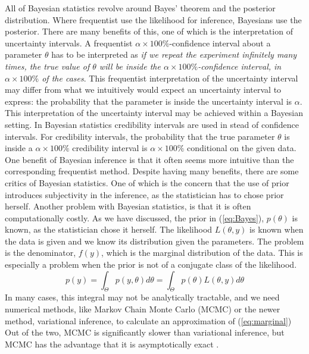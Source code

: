 All of Bayesian statistics revolve around Bayes' theorem and the posterior distribution. Where frequentist use the likelihood for inference, Bayesians use the posterior.  
There are many benefits of this, one of which is the interpretation of uncertainty intervals. 
A frequentist $\alpha \times 100\%$-confidence interval about a parameter $\theta$ has to be interpreted as \textit{if we repeat the experiment infinitely many times, the true value of $\theta$ will be inside the $\alpha\times 100\%$-confidence interval, in $\alpha\times 100\%$ of the cases}.
This frequentist interpretation of the uncertainty interval may differ from what we intuitively would expect an uncertainty interval to express: the probability that the parameter is inside the uncertainty interval is $\alpha$. 
This interpretation of the uncertainty interval may be achieved within a Bayesian setting.
In Bayesian statistics credibility intervals are used in stead of confidence intervals.
For credibility intervals, the probability that the true parameter $\theta$ is inside a $\alpha\times 100\%$ credibility interval is $\alpha\times 100\%$ conditional on the given data. 
One benefit of Bayesian inference is that it often seems more intuitive than the corresponding frequentist method.
Despite having many benefits, there are some critics of Bayesian statistics. One of which is the concern that the use of prior introduces subjectivity in the inference, as the statistician has to chose prior herself\cite{gelman2008objections}.
Another problem with Bayesian statistics, is that it is often computationally costly.
As we have discussed, the prior in (\ref{eq:Bayes}), $p\left(\theta\right)$ is known, as the statistician chose it herself. The likelihood $L\left(\theta, y\right)$ is known when the data is given and we know its distribution given the parameters.
The problem is the denominator, $f\left(y\right)$, which is the marginal distribution of the data. This is especially a problem when the prior is not of a conjugate class of the likelihood. 
\begin{equation}\label{eq:marginal}
    p\left(y\right) = \int_{\Theta}p\left(y,\theta\right) d\theta = \int_{\Theta} p\left(\theta\right)L\left(\theta, y\right) d\theta
\end{equation}
In many cases, this integral may not be analytically tractable, and we need numerical methods, like Markov Chain Monte Carlo (MCMC) or the newer method, variational inference, to calculate an approximation of (\ref{eq:marginal}) Out of the two, MCMC is significantly slower than variational inference, but MCMC has the advantage that it is asymptotically exact \cite{vi}.

